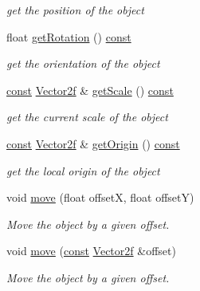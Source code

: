 \begin{DoxyCompactItemize}
\begin{DoxyCompactList}\small\item\em get the position of the object \end{DoxyCompactList}\item 
float \hyperlink{classsf_1_1_transformable_ad783a7e9971398ec613d22455252809e}{get\-Rotation} () \hyperlink{term__entry_8h_a57bd63ce7f9a353488880e3de6692d5a}{const} 
\begin{DoxyCompactList}\small\item\em get the orientation of the object \end{DoxyCompactList}\item 
\hyperlink{term__entry_8h_a57bd63ce7f9a353488880e3de6692d5a}{const} \hyperlink{namespacesf_a80cea3c46537294fd1d8d428566ad8b2}{Vector2f} \& \hyperlink{classsf_1_1_transformable_a3ea9639abd7a430ac99afb0aaf1ea562}{get\-Scale} () \hyperlink{term__entry_8h_a57bd63ce7f9a353488880e3de6692d5a}{const} 
\begin{DoxyCompactList}\small\item\em get the current scale of the object \end{DoxyCompactList}\item 
\hyperlink{term__entry_8h_a57bd63ce7f9a353488880e3de6692d5a}{const} \hyperlink{namespacesf_a80cea3c46537294fd1d8d428566ad8b2}{Vector2f} \& \hyperlink{classsf_1_1_transformable_a6bddc485d22bb64449d9d2d3a99a778f}{get\-Origin} () \hyperlink{term__entry_8h_a57bd63ce7f9a353488880e3de6692d5a}{const} 
\begin{DoxyCompactList}\small\item\em get the local origin of the object \end{DoxyCompactList}\item 
void \hyperlink{classsf_1_1_transformable_a86b461d6a941ad390c2ad8b6a4a20391}{move} (float offset\-X, float offset\-Y)
\begin{DoxyCompactList}\small\item\em Move the object by a given offset. \end{DoxyCompactList}\item 
void \hyperlink{classsf_1_1_transformable_ab9ca691522f6ddc1a40406849b87c469}{move} (\hyperlink{term__entry_8h_a57bd63ce7f9a353488880e3de6692d5a}{const} \hyperlink{namespacesf_a80cea3c46537294fd1d8d428566ad8b2}{Vector2f} \&offset)
\begin{DoxyCompactList}\small\item\em Move the object by a given offset. \end{DoxyCompactList}\item 

\end{DoxyCompactItemize}
